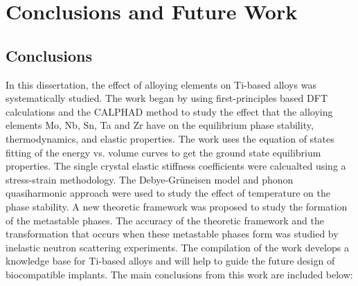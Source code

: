 \chapter{Conclusions and Future Work}

\section{Conclusions}

In this dissertation, the effect of alloying elements on Ti-based alloys was systematically studied. The work began by using first-principles based DFT calculations and the CALPHAD method to study the effect that the alloying elements Mo, Nb, Sn, Ta and Zr have on the equilibrium phase stability, thermodynamics, and elastic properties. The work uses the equation of states fitting of the energy vs. volume curves to get the ground state equilibrium properties. The single crystal elastic stiffness coefficients were calcualted using a stress-strain methodology. The Debye-Gr\"uneisen model and phonon quasiharmonic approach were used to study the effect of temperature on the phase stability. A new theoretic framework was proposed to study the formation of the metastable phases. The accuracy of the theoretic framework and the transformation that occurs when these metastable phases form was studied by inelastic neutron scattering experiments. The compilation of the work develops a knowledge base for Ti-based alloys and will help to guide the future design of biocompatible implants. The main conclusions from this work are included below:

